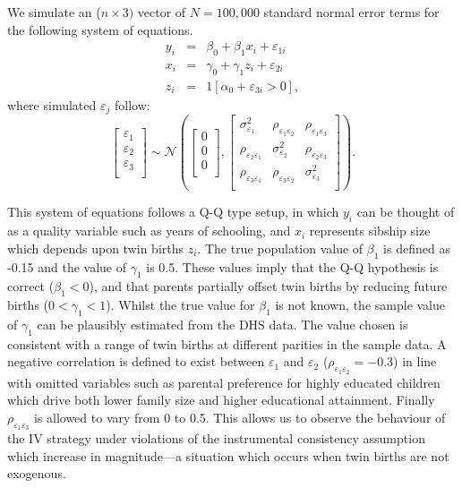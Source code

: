 \documentclass{article}[11pt,subeqn]
\begin{document}
\begin{spacing}{1.5}
We simulate an ($n \times 3)$ vector of $N=100,000$ standard normal error terms for the following system of equations.
\begin{eqnarray}
\label{eqn:MC1}
y_i&=&\beta_0+\beta_1 x_i + \varepsilon_{1i} \nonumber\\
x_i&=&\gamma_0 + \gamma_1 z_i + \varepsilon_{2i} \nonumber\\
z_i&=&1[\alpha_0+\varepsilon_{3i}>0], \nonumber
\end{eqnarray} 
where simulated $\varepsilon_j$ follow:
\begin{equation}
\begin{bmatrix}
\varepsilon_1\\
\varepsilon_2\\
\varepsilon_3\\
\end{bmatrix}
\sim \mathcal{N}
\left(\begin{bmatrix}
0\\
0\\
0\\
\end{bmatrix}
,
\begin{bmatrix}
\sigma_{\varepsilon_1}^2 &  \rho_{\varepsilon_1\varepsilon_2} &  \rho_{\varepsilon_1\varepsilon_3}\\
\rho_{\varepsilon_2\varepsilon_1} & \sigma_{\varepsilon_2}^2 &  \rho_{\varepsilon_2\varepsilon_3} \\
\rho_{\varepsilon_3\varepsilon_1}&  \rho_{\varepsilon_3\varepsilon_2}& \sigma_{\varepsilon_3}^2 \\
\end{bmatrix}\right).
\end{equation}

This system of equations follows a Q-Q type setup, in which $y_i$ can be thought of as a quality variable such as years of schooling, and $x_i$ represents
sibship size which depends upon twin births $z_i$. The true population value of $\beta_1$ is defined as -0.15 and the value of $\gamma_1$ is 0.5.  These
values imply that the Q-Q hypothesis is correct ($\beta_1<0$), and that parents partially offset twin births by reducing future births ($0<\gamma_1<1$).
Whilst the true value for $\beta_1$ is not known, the sample value of $\gamma_1$ can be plausibly estimated from the DHS data.  The  value chosen is consistent
with a range of twin births at different parities in the sample data.
A negative correlation is defined to exist between $\varepsilon_1$ and $\varepsilon_2$ ($\rho_{\varepsilon_1\varepsilon_2}=-0.3$) in line with omitted variables such as
parental preference for highly educated children which drive both lower family size and higher educational attainment. %
Finally $\rho_{\varepsilon_1\varepsilon_3}$ is allowed to vary from 0 to 0.5.  This allows
us to observe the behaviour of the IV strategy under violations of the instrumental consistency assumption which increase in magnitude---a situation
which occurs when twin births are not exogenous.


\end{spacing}
\end{document}
